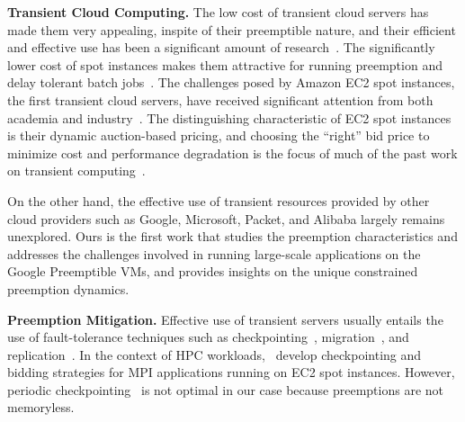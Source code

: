\noindent \textbf{Transient Cloud Computing.}
The low cost of transient cloud servers has made them very appealing, inspite of their preemptible nature, and their efficient and effective use has been a significant amount of research~\cite{prateek-thesis}. 
The significantly lower cost of spot instances makes them attractive for running preemption and delay tolerant batch jobs~\cite{spoton, jain14demand, yi2010reducing, conductor, liu-spot, spot-run, dubois2016optispot, varshney_autobot_2019}.
The challenges posed by Amazon EC2 spot instances, the first transient cloud servers, have received significant attention from both academia  and industry~\cite{spotinst}. 
The distinguishing characteristic of EC2 spot instances is their dynamic auction-based pricing, and choosing the ``right'' bid price to minimize cost and performance degradation is the focus of much of the past work on transient computing~\cite{bidding4,mihailescu2012impact,bidding7,bidding1,bidding8,bidding3,bidding6,bid-cloud,bidding5,wolski_probabilistic_2017, guo_bidding_2015}.


On the other hand, the effective use of transient resources provided by other cloud providers such as Google, Microsoft, Packet, and Alibaba largely remains unexplored. 
Ours is the first work that studies the preemption characteristics and addresses the challenges involved in running large-scale applications on the Google Preemptible VMs, and provides insights on the unique constrained preemption dynamics. %

\noindent \textbf{Preemption Mitigation.}
Effective use of transient servers usually entails the use of fault-tolerance techniques such as checkpointing~\cite{flint}, migration~\cite{spotcheck}, and replication~\cite{spoton}. 
In the context of HPC workloads,~\cite{marathe2014exploiting,gong_monetary_2015,xiang_spotmpi:_2011} develop checkpointing and bidding strategies for MPI applications running on EC2 spot instances.
However, periodic checkpointing~\cite{dongarra_fault_nodate, bougeret_checkpointing_2011} is not optimal in our case because preemptions are not memoryless. 

